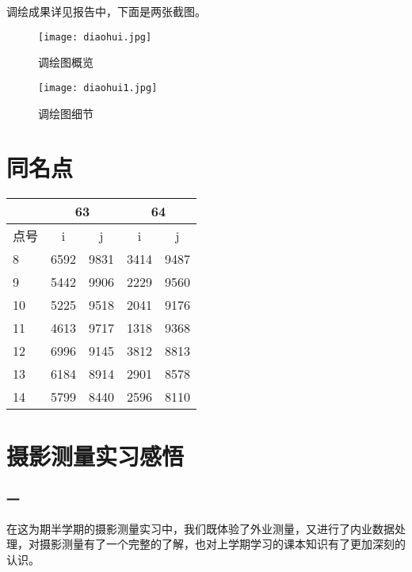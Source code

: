调绘成果详见报告中，下面是两张截图。

\begin{figure}[htbp]
\centering
\caption{调绘图概览}
\texttt{[image: diaohui.jpg]}
\end{figure}

\begin{figure}[htbp]
\centering
\caption{调绘图细节}
\texttt{[image: diaohui1.jpg]}
\end{figure}

\section{同名点}

\begin{table}[htbp]
    \centering
    \begin{tabular}{lrrrr}
        \toprule
        & \multicolumn{2}{c}{63} & \multicolumn{2}{c}{64} \\ \hline
        点号 & \multicolumn{1}{c}{i} & \multicolumn{1}{c}{j} & \multicolumn{1}{c}{i} & \multicolumn{1}{c}{j} \\ \midrule
        8  & 6592 & 9831 & 3414 & 9487 \\
        9  & 5442 & 9906 & 2229 & 9560 \\
        10 & 5225 & 9518 & 2041 & 9176 \\
        11 & 4613 & 9717 & 1318 & 9368 \\
        12 & 6996 & 9145 & 3812 & 8813 \\
        13 & 6184 & 8914 & 2901 & 8578 \\
        14 & 5799 & 8440 & 2596 & 8110 \\ \bottomrule
    \end{tabular}
    \end{table}

\section{摄影测量实习感悟}

\subsubsection{一}
在这为期半学期的摄影测量实习中，我们既体验了外业测量，又进行了内业数据处理，对摄影测量有了一个完整的了解，也对上学期学习的课本知识有了更加深刻的认识。

